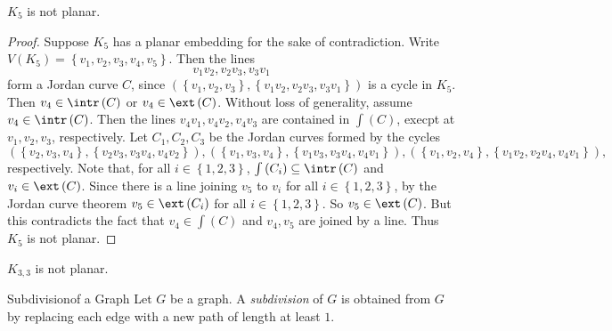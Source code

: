 \documentclass[co342]{subfiles}
\begin{document}
    \begin{cor}{}
        $K_5$ is not planar.
    \end{cor}

    \begin{proof}
        Suppose $K_5$ has a planar embedding for the sake of contradiction. Write $V\left( K_5 \right) = \left\lbrace v_1,v_2,v_3,v_4,v_5 \right\rbrace$. Then the lines
        \begin{equation*}
            v_1v_2,v_2v_3,v_3v_1
        \end{equation*}
        form a Jordan curve $C$, since $\left( \left\lbrace v_1,v_2,v_3 \right\rbrace, \left\lbrace v_1v_2,v_2v_3,v_3v_1 \right\rbrace \right)$ is a cycle in $K_5$. Then $v_4\in\intr\left( C \right)$ or $v_4\in\ext\left( C \right)$. Without loss of generality, assume $v_4\in\intr\left( C \right)$. Then the lines $v_4v_1,v_4v_2,v_4v_3$ are contained in $\int\left( C \right)$, execpt at $v_1,v_2,v_3$, respectively. Let $C_1,C_2,C_3$ be the Jordan curves formed by the cycles
        \begin{equation*}
            \left( \left\lbrace v_2,v_3,v_4 \right\rbrace, \left\lbrace v_2v_3,v_3v_4,v_4v_2 \right\rbrace \right), \left( \left\lbrace v_1,v_3,v_4 \right\rbrace, \left\lbrace v_1v_3,v_3v_4,v_4v_1 \right\rbrace \right), \left( \left\lbrace v_1,v_2,v_4 \right\rbrace, \left\lbrace v_1v_2,v_2v_4,v_4v_1 \right\rbrace \right),
        \end{equation*}
        respectively. Note that, for all $i\in\left\lbrace 1,2,3 \right\rbrace$, $\int\left( C_i \right)\subseteq\intr\left( C \right)$ and $v_i\in\ext\left( C \right)$. Since there is a line joining $v_5$ to $v_i$ for all $i\in\left\lbrace 1,2,3 \right\rbrace$, by the Jordan curve theorem $v_5\in\ext\left( C_i \right)$ for all $i\in\left\lbrace 1,2,3 \right\rbrace$. So $v_5\in\ext\left( C \right)$. But this contradicts the fact that $v_4\in\int\left( C \right)$ and $v_4,v_5$ are joined by a line. Thus $K_5$ is not planar.
    \end{proof}

    \begin{cor}{}
        $K_{3,3}$ is not planar.
    \end{cor}

    \begin{definition}{Subdivision}{of a Graph}
        Let $G$ be a graph. A \emph{subdivision} of $G$ is obtained from $G$ by replacing each edge with a new path of length at least $1$.
    \end{definition}
    
\end{document}
